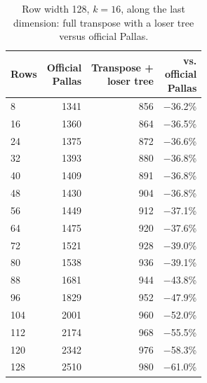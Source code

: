 \documentclass[sigconf,nonacm,balance=false]{acmart}
\begin{document}
\begin{table}
\centering
\caption{Row width 128, $k = 16$, along the last dimension: full transpose with a loser tree versus official Pallas.}
\label{tab:24}
\begin{tabular}{lrrr}
\toprule
Rows & \makecell[rb]{Official\\Pallas} & \makecell[rb]{Transpose +\\loser tree} & \makecell[rb]{vs.\\official\\Pallas} \\
\midrule
8 & 1341 & 856 & $-$36.2\% \\
16 & 1360 & 864 & $-$36.5\% \\
24 & 1375 & 872 & $-$36.6\% \\
32 & 1393 & 880 & $-$36.8\% \\
40 & 1409 & 891 & $-$36.8\% \\
48 & 1430 & 904 & $-$36.8\% \\
56 & 1449 & 912 & $-$37.1\% \\
64 & 1475 & 920 & $-$37.6\% \\
72 & 1521 & 928 & $-$39.0\% \\
80 & 1538 & 936 & $-$39.1\% \\
88 & 1681 & 944 & $-$43.8\% \\
96 & 1829 & 952 & $-$47.9\% \\
104 & 2001 & 960 & $-$52.0\% \\
112 & 2174 & 968 & $-$55.5\% \\
120 & 2342 & 976 & $-$58.3\% \\
128 & 2510 & 980 & $-$61.0\% \\
\bottomrule
\end{tabular}
\end{table}
\end{document}
